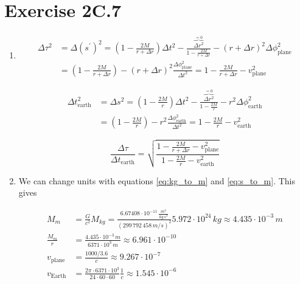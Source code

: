 \documentclass[a4paper,10pt,english]{article}
\begin{document}
\section*{Exercise 2C.7}

\begin{enumerate}

\item 

\begin{align*}
\Delta\tau^{2}&=\Delta (s^{\prime})^{2}=\left(1-\frac{2M}{r+\Delta r}\right)\Delta t^{2}-\frac{\overbrace{\Delta r^{2}}^{=0}}{1-\frac{2M}{r+\Delta r}}-(r+\Delta r)^{2}\Delta\phi^{2}_{\text{plane}}\\
&=\left(1-\frac{2M}{r+\Delta r}\right)-(r+\Delta r)^{2}\frac{\Delta\phi^{2}_{\text{plane}}}{\Delta t^{2}}=1-\frac{2M}{r+\Delta r}-v_{\text{plane}}^{2}
\end{align*}

\begin{align*}
\Delta t_{\text{earth}}^{2}&=\Delta s^{2}=\left(1-\frac{2M}{r}\right)\Delta t^{2}-\frac{\overbrace{\Delta r^{2}}^{=0}}{1-\frac{2M}{r}}-r^{2}\Delta\phi^{2}_{\text{earth}}\\
&=\left(1-\frac{2M}{r}\right)-r^{2}\frac{\Delta\phi^{2}_{\text{earth}}}{\Delta t^{2}}=1-\frac{2M}{r}-v_{\text{earth}}^{2}
\end{align*}

\begin{equation*}
\frac{\Delta\tau}{\Delta t_{\text{earth}}}=\sqrt{\frac{1-\frac{2M}{r+\Delta r}-v_{\text{plane}}^{2}}{1-\frac{2M}{r}-v_{\text{earth}}^{2}}}
\end{equation*}

\item We can change units with equations \ref{eq:kg_to_m} and \ref{eq:s_to_m}. This gives

\begin{align*}
M_{m}&=\frac{G}{c^{2}}M_{kg}=\frac{6.67408\cdot10^{-11}\,\frac{m^{3}}{kg\,s^{2}}}{(299\,792\,458\,m/s)^{2}}5.972\cdot10^{24}\,kg\approx4.435\cdot10^{-3}\,m\\
\frac{M_{m}}{r}&=\frac{4.435\cdot10^{-3}\,m}{6371\cdot10^{3}\,m}\approx6.961\cdot10^{-10}\\
v_{\text{plane}}&=\frac{1000/3.6}{c}\approx9.267\cdot10^{-7}\\
v_{\text{Earth}}&=\frac{2\pi\cdot6371\cdot10^{3}}{24\cdot60\cdot60}\frac{1}{c}\approx1.545\cdot10^{-6}
\end{align*}



\end{enumerate}
\end{document}
